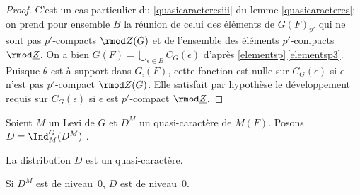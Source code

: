 \begin{proof}
C'est un cas particulier du \eqref{quasicaracteresiii} du lemme \ref{quasicaracteres}: on prend pour ensemble $B$ la réunion de celui des éléments de $G(F)_{p'}$ qui ne sont pas $p'$-compacts $\rmod Z(G)$ et de l'ensemble des éléments $p'$-compacts $\rmod \underline{Z}$. On a bien $G(F)=\bigcup_{\epsilon\in B}C_{G}(\epsilon)$ d'après \ref{elementsp}\,\eqref{elementsp3}. Puisque $\theta$ est à support dans $G_{\comp}(F)$, cette fonction est nulle sur $C_{G}(\epsilon)$ si $\epsilon$ n'est pas $p'$-compact $\rmod Z(G)$. Elle satisfait par hypothèse le développement requis sur $C_{G}(\epsilon)$ si $\epsilon$ est $p'$-compact $\rmod \underline{Z}$.
\end{proof}

\label{induction}

\begin{lem*}
Soient $M$ un Levi de $G$ et $D^M$ un quasi-caractère de $M(F)$. Posons $D= \Ind_{M}^G(D^M)$ .
\begin{enumeratei}
\item\label{inductioni}
La distribution $D$ est un quasi-caractère.

\item\label{inductionii}
Si $D^M$ est de niveau~$0$, $D$ est de niveau~$0$.
\end{enumeratei}
\end{lem*}

